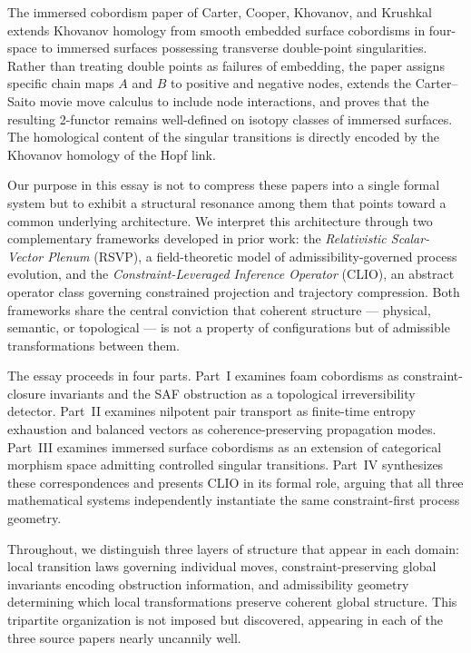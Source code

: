 \documentclass[12pt, a4paper]{article}
\theoremstyle{plain}
\theoremstyle{definition}
\theoremstyle{correspondence}
\begin{document}
The immersed cobordism paper of Carter, Cooper, Khovanov, and Krushkal \cite{CCKK25}
extends Khovanov homology from smooth embedded surface cobordisms in four-space to
immersed surfaces possessing transverse double-point singularities. Rather than
treating double points as failures of embedding, the paper assigns specific chain maps
$A$ and $B$ to positive and negative nodes, extends the Carter--Saito movie move
calculus to include node interactions, and proves that the resulting 2-functor remains
well-defined on isotopy classes of immersed surfaces. The homological content of the
singular transitions is directly encoded by the Khovanov homology of the Hopf link.

Our purpose in this essay is not to compress these papers into a single formal system
but to exhibit a structural resonance among them that points toward a common underlying
architecture. We interpret this architecture through two complementary frameworks
developed in prior work: the \emph{Relativistic Scalar-Vector Plenum} (RSVP), a
field-theoretic model of admissibility-governed process evolution, and the
\emph{Constraint-Leveraged Inference Operator} (CLIO), an abstract operator class
governing constrained projection and trajectory compression. Both frameworks share the
central conviction that coherent structure --- physical, semantic, or topological ---
is not a property of configurations but of admissible transformations between them.

The essay proceeds in four parts. Part~I examines foam cobordisms as constraint-closure
invariants and the SAF obstruction as a topological irreversibility detector. Part~II
examines nilpotent pair transport as finite-time entropy exhaustion and balanced vectors
as coherence-preserving propagation modes. Part~III examines immersed surface cobordisms
as an extension of categorical morphism space admitting controlled singular transitions.
Part~IV synthesizes these correspondences and presents CLIO in its formal role, arguing
that all three mathematical systems independently instantiate the same constraint-first
process geometry.

Throughout, we distinguish three layers of structure that appear in each domain: local
transition laws governing individual moves, constraint-preserving global invariants
encoding obstruction information, and admissibility geometry determining which local
transformations preserve coherent global structure. This tripartite organization is not
imposed but discovered, appearing in each of the three source papers nearly
uncannily well.
\end{document}
